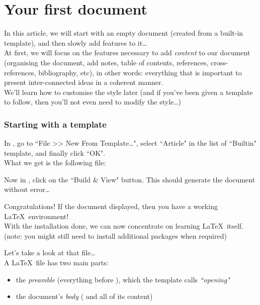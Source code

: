 

\part{Your first document} \label{your-first-document}


In this article, we will start with an empty document (created from a built-in template), and then slowly add features to it\dots \\

At first, we will focus on the features necessary to add \emph{content} to our document (organising the document, add notes, table of contents, references, cross-references, bibliography, etc), in other words: everything that is important to present inter-connected ideas in a coherent manner. \\

We'll learn how to customise the style later (and if you've been given a template to follow, then you'll not even need to modify the style\dots)


\section{Starting with a template}

In \TeXstudio, go to ``File >> New From Template\dots", select ``Article" in the list of ``Builtin" template, and finally click ``OK". \\

What we get is the following file:


Now in \TeXstudio, click on the ``Build \& View" button. This should generate the document without error\dots

\begin{note}
Congratulations! If the document displayed, then you have a working \LaTeX\ environment!\\

With the installation done, we can now concentrate on learning \LaTeX\ itself. (note: you might still need to install additional packages when required)
\end{note}

\bigskip

Let's take a look at that file\dots \\

A \LaTeX\ file has two main parts:
\begin{itemize}
	\item the \emph{preamble} (everything before \lstinline[language=tex]|| ), which the template calls \emph{``opening"}
		
	\item the document's \emph{body} (\lstinline[language=tex]|| and all of its content)
\end{itemize}

